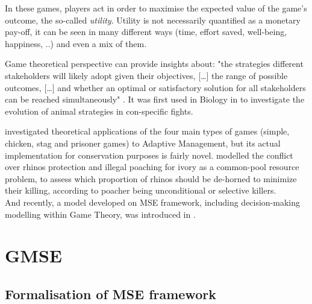 \documentclass[12pt,a4paper]{article}
\begin{document}
In these games, players act in order to maximise the expected value of the game's outcome, the so-called \textit{utility}.
Utility is not necessarily quantified as a monetary pay-off, it can be seen in many different ways (time, effort saved, well-being, happiness, ..) and even a mix of them.

Game theoretical perspective can provide insights about: "the strategies different stakeholders will likely adopt given their objectives, [\dots] the range of possible outcomes, [\dots] and whether an optimal or satisfactory solution for all stakeholders can be reached simultaneously" \citep{COLYVAN20111246}.
It was first used in Biology in \cite{maynard1973logic} to investigate the evolution of animal strategies in con-specific fights.

\cite{COLYVAN20111246} investigated theoretical applications of the four main types of games (simple, chicken, stag and prisoner games) to Adaptive Management, but its actual implementation for conservation purposes is fairly novel. 
\cite{glynatsi2018evolutionary} modelled the conflict over rhinos protection and illegal poaching for ivory as a common-pool resource problem, to assess which proportion of rhinos should be de-horned to minimize their killing, according to poacher being unconditional or selective killers.\\ %
And recently, a model developed on MSE framework, including decision-making modelling within Game Theory, was introduced in \cite{duthie2018} .

\section{GMSE}%

\subsection{Formalisation of MSE framework}
\end{document}
